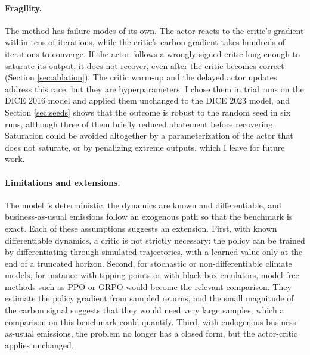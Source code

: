 \paragraph{Fragility.} The method has failure modes of its own. The actor reacts to the critic's gradient within tens of iterations, while the critic's carbon gradient takes hundreds of iterations to converge. If the actor follows a wrongly signed critic long enough to saturate its output, it does not recover, even after the critic becomes correct (Section \ref{sec:ablation}). The critic warm-up and the delayed actor updates address this race, but they are hyperparameters. I chose them in trial runs on the DICE 2016 model and applied them unchanged to the DICE 2023 model, and Section \ref{sec:seeds} shows that the outcome is robust to the random seed in six runs, although three of them briefly reduced abatement before recovering. Saturation could be avoided altogether by a parameterization of the actor that does not saturate, or by penalizing extreme outputs, which I leave for future work.

\paragraph{Limitations and extensions.} The model is deterministic, the dynamics are known and differentiable, and business-as-usual emissions follow an exogenous path so that the benchmark is exact. Each of these assumptions suggests an extension. First, with known differentiable dynamics, a critic is not strictly necessary: the policy can be trained by differentiating through simulated trajectories, with a learned value only at the end of a truncated horizon. Second, for stochastic or non-differentiable climate models, for instance with tipping points or with black-box emulators, model-free methods such as PPO or GRPO would become the relevant comparison. They estimate the policy gradient from sampled returns, and the small magnitude of the carbon signal suggests that they would need very large samples, which a comparison on this benchmark could quantify. Third, with endogenous business-as-usual emissions, the problem no longer has a closed form, but the actor-critic applies unchanged.
